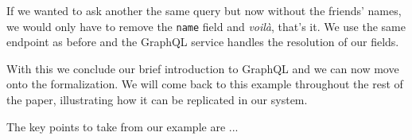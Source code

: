 If we wanted to ask another the same query but now without the friends' names, we would only have to remove the \texttt{name} field and \textit{voilà}, that's it. We use the same endpoint as before and the GraphQL service handles the resolution of our fields.

With this we conclude our brief introduction to GraphQL and we can now move onto the formalization. We will come back to this example throughout the rest of the paper, illustrating how it can be replicated in our system.

The key points to take from our example are ...
